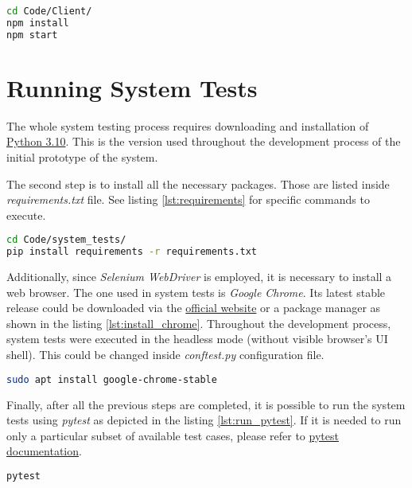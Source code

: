 \begin{lstlisting}[language=bash, caption={Install dependencies and build \textit{Client}.}, label=lst:client_deps_and_build]
cd Code/Client/
npm install
npm start
\end{lstlisting}

\section{Running System Tests}

The whole system testing process requires downloading and installation of \href{https://www.python.org/downloads/release/python-3100/}{Python 3.10}. This is the version used throughout the development process of the initial prototype of the system.

The second step is to install all the necessary packages. Those are listed inside \textit{requirements.txt} file. See listing \ref{lst:requirements} for specific commands to execute.

\begin{lstlisting}[language=bash, caption={Install requirements.}, label=lst:requirements]
cd Code/system_tests/
pip install requirements -r requirements.txt
\end{lstlisting}

Additionally, since \textit{Selenium WebDriver} is employed, it is necessary to install a web browser. The one used in system tests is \textit{Google Chrome}. Its latest stable release could be downloaded via the \href{https://www.google.com/intl/en/chrome/}{official website} or a package manager as shown in the listing \ref{lst:install_chrome}. Throughout the development process, system tests were executed in the headless mode (without visible browser's UI shell). This could be changed inside \textit{conftest.py} configuration file.

\begin{lstlisting}[language=bash, caption={Install Google Chrome.}, label={lst:install_chrome}]
sudo apt install google-chrome-stable
\end{lstlisting}

Finally, after all the previous steps are completed, it is possible to run the system tests using \textit{pytest} as depicted in the listing \ref{lst:run_pytest}. If it is needed to run only a particular subset of available test cases, please refer to \href{https://docs.pytest.org/en/latest/how-to/usage.html}{pytest documentation}.

\begin{lstlisting}[language=bash, caption={Run system tests.}, label={lst:run_pytest}]
pytest
\end{lstlisting}